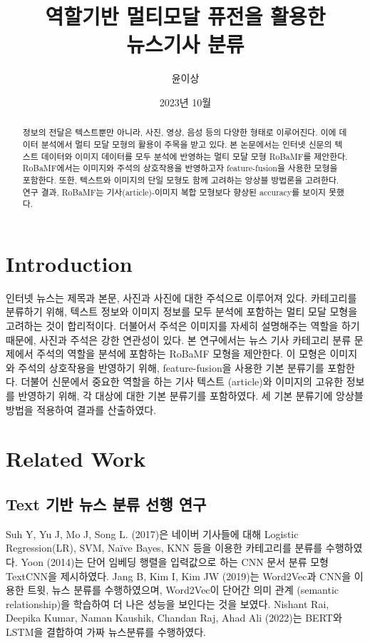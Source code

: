 \documentclass{article}
\title{역할기반 멀티모달 퓨전을 활용한\\ 뉴스기사 분류}
\author{윤이상}
\date{2023년 10월}
\begin{document}
\maketitle

\begin{abstract}
정보의 전달은 텍스트뿐만 아니라, 사진, 영상, 음성 등의 다양한 형태로 이루어진다. 이에 데이터 분석에서 멀티 모달 모형의 활용이 주목을 받고 있다. 본 논문에서는 인터넷 신문의 텍스트 데이터와 이미지 데이터를 모두 분석에 반영하는 멀티 모달 모형 RoBaMF를 제안한다. RoBaMF에서는 이미지와 주석의 상호작용을 반영하고자 feature-fusion을 사용한 모형을 포함한다. 또한, 텍스트와 이미지의 단일 모형도 함께 고려하는 앙상블 방법론을 고려한다. 연구 결과, RoBaMF는 기사(article)-이미지 복합 모형보다 향상된 accuracy를 보이지 못했다.
\end{abstract}

\section{Introduction}
인터넷 뉴스는 제목과 본문, 사진과 사진에 대한 주석으로 이루어져 있다. 카테고리를 분류하기 위해, 텍스트 정보와 이미지 정보를 모두 분석에 포함하는 멀티 모달 모형을 고려하는 것이 합리적이다. 더불어서 주석은 이미지를 자세히 설명해주는 역할을 하기 때문에, 사진과 주석은 강한 연관성이 있다. 본 연구에서는 뉴스 기사 카테고리 분류 문제에서 주석의 역할을 분석에 포함하는 RoBaMF 모형을 제안한다. 이 모형은 이미지와 주석의 상호작용을 반영하기 위해, feature-fusion을 사용한 기본 분류기를 포함한다. 더불어 신문에서 중요한 역할을 하는 기사 텍스트 (article)와 이미지의 고유한 정보를 반영하기 위해, 각 대상에 대한 기본 분류기를 포함하였다. 세 기본 분류기에 앙상블 방법을 적용하여 결과를 산출하였다.

\section{Related Work}
\subsection{Text 기반 뉴스 분류 선행 연구}
Suh Y, Yu J, Mo J, Song L. (2017)은 네이버 기사들에 대해 Logistic Regression(LR), SVM, Naïve Bayes, KNN 등을 이용한 카테고리를 분류를 수행하였다\cite{suh2017comparison}.
Yoon (2014)는 단어 임베딩 행렬을 입력값으로 하는 CNN 문서 분류 모형 TextCNN을 제시하였다\cite{kim2014convolutional}.
Jang B, Kim I, Kim JW (2019)는 Word2Vec과 CNN을 이용한 트윗, 뉴스 분류를 수행하였으며, Word2Vec이 단어간 의미 관계 (semantic relationship)을 학습하여 더 나은 성능을 보인다는 것을 보였다\cite{jang2019word2vec}.
Nishant Rai, Deepika Kumar, Naman Kaushik, Chandan Raj, Ahad Ali (2022)는 BERT와 LSTM을 결합하여 가짜 뉴스분류를 수행하였다\cite{rai2022fake}.
\end{document}
